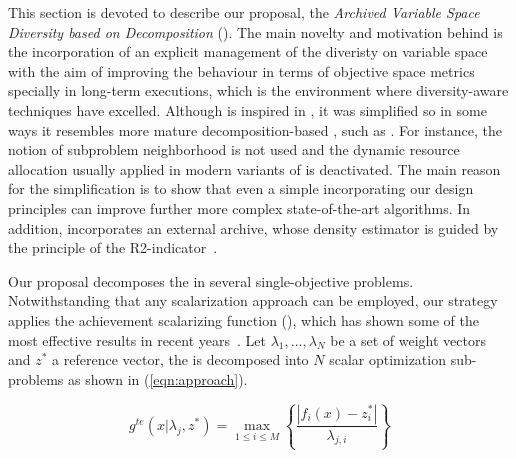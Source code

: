 
This section is devoted to describe our proposal, the \textit{Archived Variable Space Diversity \MOEA{} based on Decomposition} (\AVSDMOEAD{}).
%
The main novelty and motivation behind \AVSDMOEAD{} is the incorporation of an explicit management of the diveristy on variable space
with the aim of improving the behaviour in terms of objective space metrics specially in long-term executions, which is the
environment where diversity-aware techniques have excelled.
%
Although \AVSDMOEAD{} is inspired in \MOEAD{}, it was simplified so in some ways it resembles more mature
decomposition-based \MOEAS{}, such as \MOGA{}.
%
For instance, the notion of subproblem neighborhood is not used and the dynamic resource allocation usually applied in modern variants
of \MOEAD{} is deactivated.
%
The main reason for the simplification is to show that even a simple \MOEA{} incorporating our design principles can
improve further more complex state-of-the-art algorithms.
%
In addition, \AVSDMOEAD{} incorporates an external archive, whose density estimator is guided by the principle of the R2-indicator~\cite{trautmann2013r2}.

Our proposal decomposes the \MOP{} in several single-objective problems.
%
Notwithstanding that any scalarization approach can be employed, our strategy applies the achievement scalarizing function (\ASF{}), which has shown
some of the most effective results in recent years~\cite{deb2013evolutionary, hernandez2015improved}.
%
Let $\lambda_1, ..., \lambda_N$ be a set of weight vectors and $z^*$ a reference vector,
the \MOP{} is decomposed into $N$ scalar optimization sub-problems as shown in (\ref{eqn:approach}).
%

\begin{equation}\label{eqn:approach}
\displaystyle{
 g^{te}(x| \lambda_j, z^*) = \max_{ 1 \leq i \leq M} \left \{ \frac{ | f_i(x) - z_i^*|}{\lambda_{j,i}} \right \} 
}
\end{equation}

